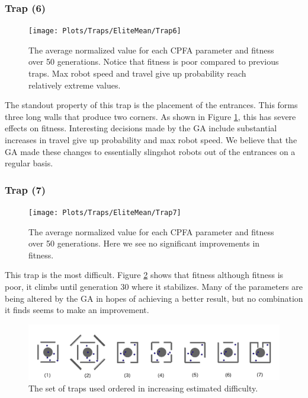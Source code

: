 \documentclass{acm_proc_article-sp}
\begin{document}
\subsubsection{Trap (6)}

\begin{figure}[h]
\texttt{[image: Plots/Traps/EliteMean/Trap6]}
\caption{The average normalized value for each CPFA parameter and fitness over 50 generations. Notice that fitness is poor compared to previous traps. Max robot speed and travel give up probability reach relatively extreme values.} \label{fig:Trap6}
\end{figure}

The standout property of this trap is the placement of the entrances. This forms three long walls that produce two corners. As shown in Figure \ref{fig:Trap6}, this has severe effects on fitness. Interesting decisions made by the GA include substantial increases in travel give up probability and max robot speed. We believe that the GA made these changes to essentially slingshot robots out of the entrances on a regular basis.

\subsubsection{Trap (7)}

\begin{figure}[h]
\texttt{[image: Plots/Traps/EliteMean/Trap7]}
\caption{The average normalized value for each CPFA parameter and fitness over 50 generations. Here we see no significant improvements in fitness.} \label{fig:Trap7}
\end{figure}

This trap is the most difficult. Figure \ref{fig:Trap7} shows that fitness although fitness is poor, it climbs until generation 30 where it stabilizes. Many of the parameters are being altered by the GA in hopes of achieving a better result, but no combination it finds seems to make an improvement.

\begin{figure}[hb]
\includegraphics[width=18cm]{images/TrapTypes}
\caption{The set of traps used ordered in increasing estimated difficulty.} \label{fig:Traps}
\end{figure}
\end{document}
